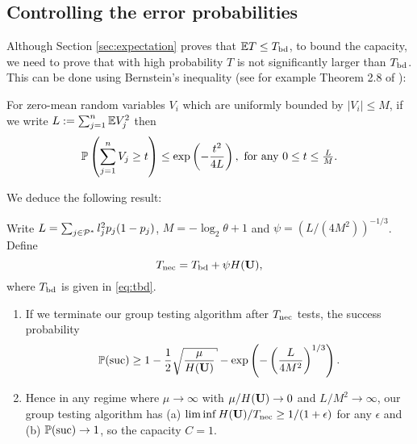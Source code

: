 \subsection{Controlling the error probabilities} \label{sec:main}
%
Although Section \ref{sec:expectation} proves that ${\mathbb{E}} T \leq T_{{\mathrm{bd}}}$,
 to bound the capacity, we need to prove that with high probability
$T$ is not significantly larger than $T_{{\mathrm{bd}}}$. This can be done using
 Bernstein's inequality (see for example Theorem 2.8 of \cite{petrov}):
%
\begin{theorem}[Bernstein] \label{thm:bernstein}
For zero-mean random variables $V_i$ which are uniformly bounded by $|V_i| \leq M$,
if we write $L  := \sum_{j=1}^n {\mathbb{E}} V_j^2 $
 then
\begin{equation} {\mathbb{P}} \left( \sum_{j=1}^n V_j \geq t \right)  \leq  \exp \left( - \frac{ t^2}{4 L}  \right),  \mbox{
for any $0 \leq t \leq \frac{L}{M}$.}   \label{eq:bernstein}
\end{equation}
\end{theorem}
%
We deduce the following result:
%
\begin{theorem} \label{thm:main}
Write  $L = \sum_{j \in {\mathcal{P}}^*} l_j^2 p_j (1-p_j)$,  $M = -\log_2 \theta+1$
and $\psi = (L/(4M^2))^{-1/3}$.
Define
\begin{equation} \label{eq:tnec}
 T_{{\mathrm{nec}}} = T_{{\mathrm{bd}}} + \psi H({\mathbf{ U}}), \end{equation}
where $T_{{\mathrm{bd}}} $ is given in \eqref{eq:tbd}.
\begin{enumerate}
\item \label{it:part1} If we terminate our group testing algorithm after
$T_{{\mathrm{nec}}}$ tests, the success probability
\begin{equation} \label{eq:errorprob} 
\pr(\suc) \geq 1 - \frac{1}{2} \sqrt{ \frac{\mu}{H(\vc{U}) }} -  \exp \left( - \left( \frac{L}{4  M^2 }  \right)^{1/3}
\right).
\end{equation}
\item \label{it:part2}
Hence  in any regime where $\mu \rightarrow \infty$ with
 $\mu/H({\mathbf{ U}}) \rightarrow 0$ and $L/M^2 \rightarrow \infty$,  
our group testing algorithm has  (a) $ \liminf H({\mathbf{ U}})/T_{{\mathrm{nec}}} \geq 1/(1+ \epsilon)$ for any $\epsilon$ and (b)
${\mathbb{P}}({\mathrm{suc}}) \rightarrow 1$, so the capacity $C = 1$.
\end{enumerate}
\end{theorem}
